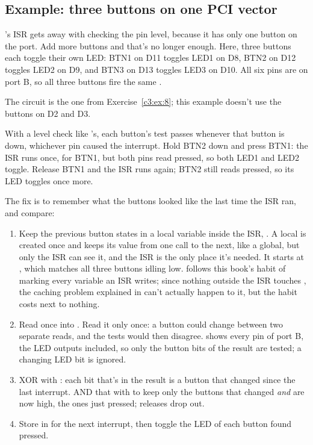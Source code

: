 \subsection{Example: three buttons on one PCI vector}
\label{c3:a:8}
's ISR gets away with checking the pin level, because it has only one button on the
port. Add more buttons and that's no longer enough. Here, three buttons each toggle their own LED:
BTN1 on D11 toggles LED1 on D8, BTN2 on D12 toggles LED2 on D9, and BTN3 on D13 toggles LED3 on
D10. All six pins are on port B, so all three buttons fire the same .

The circuit is the one from Exercise~\ref{c3:ex:8}; this example doesn't use the buttons on D2 and
D3.


With a level check like 's, each button's test passes whenever that button is down,
whichever pin caused the interrupt. Hold BTN2 down and press BTN1: the ISR runs once, for BTN1, but
both pins read pressed, so both LED1 and LED2 toggle. Release BTN1 and the ISR runs again; BTN2 still reads
pressed, so its LED toggles once more.

The fix is to remember what the buttons looked like the last time the ISR ran, and compare:

\begin{enumerate}
  \item Keep the previous button states in a  local variable inside the ISR,
    . A  local is created once and keeps its value from one call to the
    next, like a global, but only the ISR can see it, and the ISR is the only place it's needed. It
    starts at , which matches all three buttons idling low.  follows this book's
    habit of marking every variable an ISR writes; since nothing outside the ISR touches
    , the caching problem explained in  can't actually happen to it, but
    the habit costs next to nothing.
  \item Read  once into . Read it only once: a button could change between two
    separate reads, and the tests would then disagree.  shows every pin of port B, the
    LED outputs included, so only the button bits of the result are tested; a changing LED bit is
    ignored.
  \item XOR  with : each bit that's  in the result is a button that
    changed since the last interrupt. AND that with  to keep only the buttons that
    changed \emph{and} are now high, the ones just pressed; releases drop out.
  \item Store  in  for the next interrupt, then toggle the LED of each button
    found pressed.
\end{enumerate}

